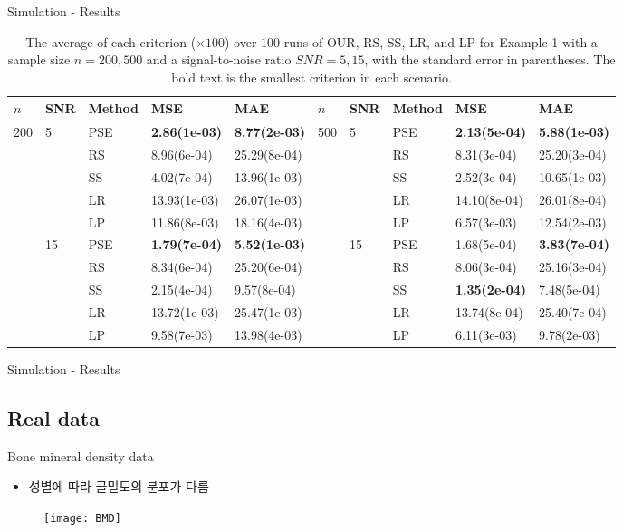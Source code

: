\begin{frame}{Simulation - Results}
\begin{table}[!htb]
\centering
\footnotesize
\caption{The average of each criterion ($\times 100$) over $100$ runs of OUR, RS,
SS, LR, and LP for Example 1 with a sample size $n = 200, 500$ and a signal-to-noise ratio 
$SNR = 5, 15$, with the standard error in parentheses. The bold text is the smallest
criterion in each scenario.}
\label{tb : ex1}
\tabcolsep=5pt
\begin{tabular}{lllll||lllll}
  \hline
$n$ & SNR & Method & MSE & MAE & $n$ & SNR & Method & MSE & MAE \\ 
  \hline
200 & 5 & PSE & \textbf{2.86(1e-03)} & \textbf{8.77(2e-03)} & 500 & 5 & PSE & \textbf{2.13(5e-04)} & \textbf{5.88(1e-03)} \\ 
   &  & RS & 8.96(6e-04) & 25.29(8e-04) &  &  & RS & 8.31(3e-04) & 25.20(3e-04) \\ 
   &  & SS & 4.02(7e-04) & 13.96(1e-03) &  &  & SS & 2.52(3e-04) & 10.65(1e-03) \\ 
   &  & LR & 13.93(1e-03) & 26.07(1e-03) &  &  & LR & 14.10(8e-04) & 26.01(8e-04) \\ 
   &  & LP & 11.86(8e-03) & 18.16(4e-03) &  &  & LP & 6.57(3e-03) & 12.54(2e-03) \\  \cline{2-5} \cline{7-10}
   & 15 & PSE & \textbf{1.79(7e-04)} & \textbf{5.52(1e-03)} &  & 15 & PSE & 1.68(5e-04) & \textbf{3.83(7e-04)} \\ 
   &  & RS & 8.34(6e-04) & 25.20(6e-04) &  &  & RS & 8.06(3e-04) & 25.16(3e-04) \\ 
   &  & SS & 2.15(4e-04) & 9.57(8e-04) &  &  & SS & \textbf{1.35(2e-04)} & 7.48(5e-04) \\ 
   &  & LR & 13.72(1e-03) & 25.47(1e-03) &  &  & LR & 13.74(8e-04) & 25.40(7e-04) \\ 
   &  & LP & 9.58(7e-03) & 13.98(4e-03) &  &  & LP & 6.11(3e-03) & 9.78(2e-03) \\ 
   \hline
\end{tabular}
\end{table}
\end{frame}

\begin{frame}{Simulation - Results}

\end{frame}
\fi %

\subsection{Real data}
\begin{frame}{Bone mineral density data}
\begin{itemize}
\item 성별에 따라 골밀도의 분포가 다름
\end{itemize}
\begin{figure}
\texttt{[image: BMD]}
\end{figure}
\end{frame}

